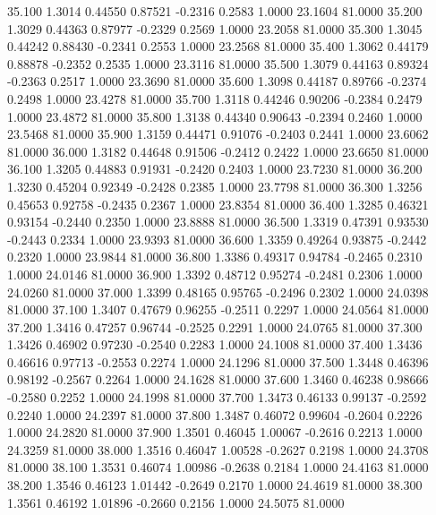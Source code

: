   35.100   1.3014   0.44550   0.87521  -0.2316   0.2583   1.0000  23.1604  81.0000
  35.200   1.3029   0.44363   0.87977  -0.2329   0.2569   1.0000  23.2058  81.0000
  35.300   1.3045   0.44242   0.88430  -0.2341   0.2553   1.0000  23.2568  81.0000
  35.400   1.3062   0.44179   0.88878  -0.2352   0.2535   1.0000  23.3116  81.0000
  35.500   1.3079   0.44163   0.89324  -0.2363   0.2517   1.0000  23.3690  81.0000
  35.600   1.3098   0.44187   0.89766  -0.2374   0.2498   1.0000  23.4278  81.0000
  35.700   1.3118   0.44246   0.90206  -0.2384   0.2479   1.0000  23.4872  81.0000
  35.800   1.3138   0.44340   0.90643  -0.2394   0.2460   1.0000  23.5468  81.0000
  35.900   1.3159   0.44471   0.91076  -0.2403   0.2441   1.0000  23.6062  81.0000
  36.000   1.3182   0.44648   0.91506  -0.2412   0.2422   1.0000  23.6650  81.0000
  36.100   1.3205   0.44883   0.91931  -0.2420   0.2403   1.0000  23.7230  81.0000
  36.200   1.3230   0.45204   0.92349  -0.2428   0.2385   1.0000  23.7798  81.0000
  36.300   1.3256   0.45653   0.92758  -0.2435   0.2367   1.0000  23.8354  81.0000
  36.400   1.3285   0.46321   0.93154  -0.2440   0.2350   1.0000  23.8888  81.0000
  36.500   1.3319   0.47391   0.93530  -0.2443   0.2334   1.0000  23.9393  81.0000
  36.600   1.3359   0.49264   0.93875  -0.2442   0.2320   1.0000  23.9844  81.0000
  36.800   1.3386   0.49317   0.94784  -0.2465   0.2310   1.0000  24.0146  81.0000
  36.900   1.3392   0.48712   0.95274  -0.2481   0.2306   1.0000  24.0260  81.0000
  37.000   1.3399   0.48165   0.95765  -0.2496   0.2302   1.0000  24.0398  81.0000
  37.100   1.3407   0.47679   0.96255  -0.2511   0.2297   1.0000  24.0564  81.0000
  37.200   1.3416   0.47257   0.96744  -0.2525   0.2291   1.0000  24.0765  81.0000
  37.300   1.3426   0.46902   0.97230  -0.2540   0.2283   1.0000  24.1008  81.0000
  37.400   1.3436   0.46616   0.97713  -0.2553   0.2274   1.0000  24.1296  81.0000
  37.500   1.3448   0.46396   0.98192  -0.2567   0.2264   1.0000  24.1628  81.0000
  37.600   1.3460   0.46238   0.98666  -0.2580   0.2252   1.0000  24.1998  81.0000
  37.700   1.3473   0.46133   0.99137  -0.2592   0.2240   1.0000  24.2397  81.0000
  37.800   1.3487   0.46072   0.99604  -0.2604   0.2226   1.0000  24.2820  81.0000
  37.900   1.3501   0.46045   1.00067  -0.2616   0.2213   1.0000  24.3259  81.0000
  38.000   1.3516   0.46047   1.00528  -0.2627   0.2198   1.0000  24.3708  81.0000
  38.100   1.3531   0.46074   1.00986  -0.2638   0.2184   1.0000  24.4163  81.0000
  38.200   1.3546   0.46123   1.01442  -0.2649   0.2170   1.0000  24.4619  81.0000
  38.300   1.3561   0.46192   1.01896  -0.2660   0.2156   1.0000  24.5075  81.0000
